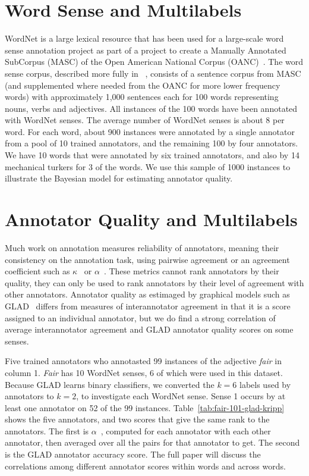 \documentclass[11pt]{article}
\begin{document}
\section{Word Sense and Multilabels} %

WordNet is a large lexical resource that has been used for a
large-scale word sense annotation project as part of a project to
create a Manually Annotated SubCorpus (MASC) of the Open American
National Corpus (OANC)~\cite{ideEtAl10}. The word sense corpus,
described more fully in ~\cite{passonneauEtAl12}, consists of a
sentence corpus from MASC (and supplemented where needed from the OANC
for more lower frequency words) with approximately 1,000 sentences
each for 100 words representing nouns, verbs and adjectives. All
instances of the 100 words have been annotated with WordNet senses.
The average number of WordNet senses is about 8 per word. For each
word, about 900 instances were annotated by a single annotator from a
pool of 10 trained annotators, and the remaining 100 by four
annotators. We have 10 words that were annotated by six trained
annotators, and also by 14 mechanical turkers for 3 of the words. We
use this sample of 1000 instances to illustrate the Bayesian model for
estimating annotator quality.

\section{Annotator Quality and Multilabels} %

Much work on annotation measures reliability of annotators, meaning
their consistency on the annotation task, using pairwise agreement or
an agreement coefficient such as $\kappa$~\cite{cohen60} or
$\alpha$~\cite{krippendorff80}. These metrics cannot rank annotators
by their quality, they can only be used to rank annotators by their
level of agreement with other annotators. Annotator quality as
estimaged by graphical models such as GLAD~\cite{whitehillEtAl-2009}
differs from measures of interannotator agreement in that it is a
score assigned to an individual annotator, but we do find a strong
correlation of average interannotator agreement and GLAD annotator
quality scores on some senses.

Five trained annotators who annotasted 99 instances of the adjective
{\it fair} in column 1. {\it Fair} has 10 WordNet senses, 6 of which
were used in this dataset. Because GLAD learns binary classifiers, we
converted the $k=6$ labels used by annotators to $k=2$, to investigate
each WordNet sense. Sense 1 occurs by at least one annotator on 52 of
the 99 instances. Table~\ref{tab:fair-101-glad-kripp} shows the five
annotators, and two scores that give the same rank to the annotators.
The first is $\alpha$~\cite{krippendorff80}, computed for each
annotator with each other annotator, then averaged over all the pairs
for that annotator to get. The second is the GLAD annotator accuracy
score. The full paper will discuss the correlations among different
annotator scores within words and across words.
\end{document}
